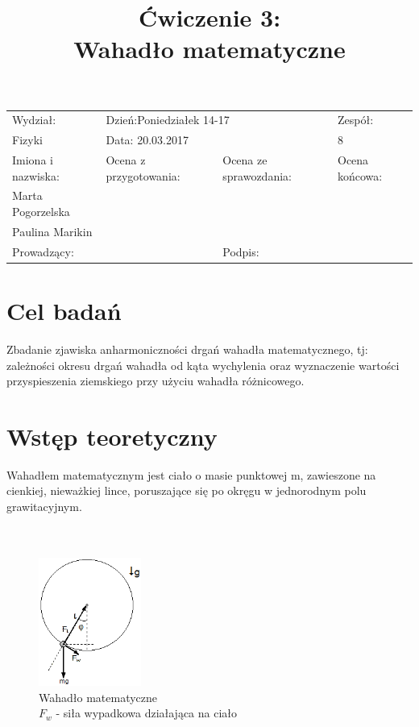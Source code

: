 \documentclass[a4paper,10pt]{article}
\def\arraystretch{1.2}
\begin{document}
\begin{table}
  \centering
  \def\arraystretch{1.5}
    \begin{tabular}{|l|l|l|l|} \hline
    Wydział:           & \multicolumn{2}{l|}{Dzień:Poniedziałek 14-17}    &Zespół:  \\
    Fizyki             &    \multicolumn{2}{l|}{Data: 20.03.2017}         &8             \\\hline
    Imiona i nazwiska: &Ocena z przygotowania:  &Ocena ze sprawozdania:   &Ocena końcowa: \\
    Marta Pogorzelska  &                        &                         &                \\
    Paulina Marikin    &                        &                         &\\\hline
    \multicolumn{2}{|l|}{Prowadzący:                 } &\multicolumn{2}{l|}{Podpis:             }  \\\hline
  \end{tabular}
\end{table}


\title{Ćwiczenie 3:\\Wahadło matematyczne}
\date{}
\maketitle{}

\section{Cel badań}
Zbadanie zjawiska anharmoniczności drgań wahadła matematycznego, tj: zależności okresu drgań wahadła od kąta wychylenia oraz wyznaczenie wartości przyspieszenia ziemskiego przy użyciu wahadła różnicowego.

\section{Wstęp teoretyczny}
Wahadłem matematycznym jest ciało o masie punktowej m, zawieszone na cienkiej, nieważkiej lince, poruszające się po okręgu w jednorodnym polu grawitacyjnym.
\\
\\
\\
\begin{figure}[H]
\centering
\includegraphics[width=0.3\textwidth]{wahadlo.png}
\caption{Wahadło matematyczne \\$F_w$ - siła wypadkowa działająca na ciało}
\end{figure}
\end{document}
